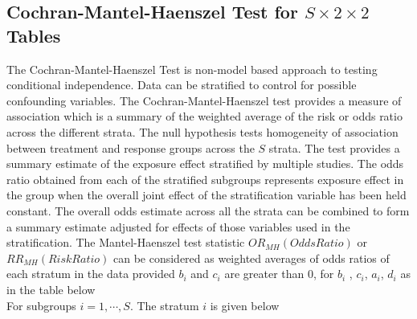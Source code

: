 \documentclass[12pt,oneside]{report}
\theoremstyle{definition}
\theoremstyle{mystyle}
\begin{document}
\subsection{Cochran-Mantel-Haenszel Test for $S\times2\times 2$ Tables}
The Cochran-Mantel-Haenszel Test is non-model based approach to testing conditional independence. Data can be stratified to control for possible confounding variables. The Cochran-Mantel-Haenszel test provides a measure of association which is a  summary of the weighted average of the risk or odds ratio across the different strata. The null hypothesis tests homogeneity of association between treatment and response groups  across the $S$ strata. The test provides  a summary estimate of the exposure effect stratified by multiple studies. The odds ratio obtained from each of the stratified subgroups represents exposure effect in the group when the overall joint effect of the stratification variable  has been held constant. The overall odds estimate across all the strata can be combined to form  a summary estimate adjusted for effects of those variables used in the stratification. The Mantel-Haenszel test statistic $OR_{MH}(Odds Ratio)$ or $RR_{MH}(Risk Ratio)$ can be considered as  weighted averages of odds ratios of each stratum in the data provided $b_{i}$ and $c_{i}$ are greater than 0, for $b_{i}$ , $c_{i}$, $a_{i}$, $d_{i}$  as in the table below\\
For subgroups $i=1,\cdots,S$. The stratum $i$ is given below\\




\end{document}
